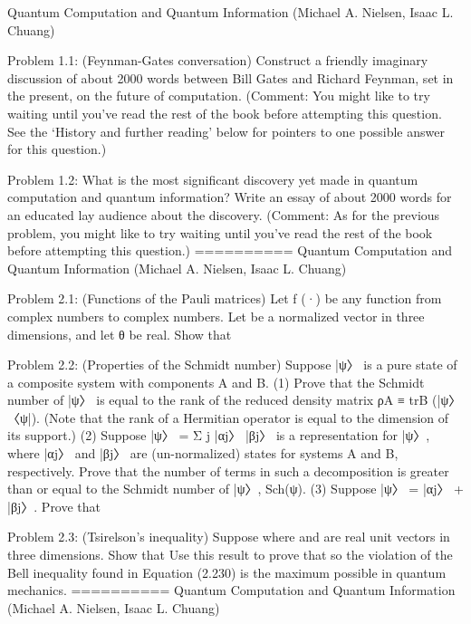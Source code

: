 \documentclass{article}
\newcommand{\0}{{$|0\rangle$}}
\newcommand{\1}{{$|1\rangle$}}
\newcommand{\2}{\frac{1}{\sqrt{2}}}
\begin{document}
Quantum Computation and Quantum Information (Michael A. Nielsen, Isaac L. Chuang)

Problem 1.1: (Feynman-Gates conversation) Construct a friendly imaginary discussion of about 2000 words between Bill Gates and Richard Feynman, set in the present, on the future of computation. (Comment: You might like to try waiting until you’ve read the rest of the book before attempting this question. See the ‘History and further reading’ below for pointers to one possible answer for this question.)

Problem 1.2: What is the most significant discovery yet made in quantum computation and quantum information? Write an essay of about 2000 words for an educated lay audience about the discovery. (Comment: As for the previous problem, you might like to try waiting until you’ve read the rest of the book before attempting this question.)
==========
Quantum Computation and Quantum Information (Michael A. Nielsen, Isaac L. Chuang)

Problem 2.1: (Functions of the Pauli matrices) Let f (·) be any function from complex numbers to complex numbers. Let be a normalized vector in three dimensions, and let θ be real. Show that

Problem 2.2: (Properties of the Schmidt number) Suppose |ψ〉 is a pure state of a composite system with components A and B. (1) Prove that the Schmidt number of |ψ〉 is equal to the rank of the reduced density matrix ρA ≡ trB (|ψ〉 〈ψ|). (Note that the rank of a Hermitian operator is equal to the dimension of its support.) (2) Suppose |ψ〉 = Σ j |αj〉 |βj〉 is a representation for |ψ〉, where |αj〉 and |βj〉 are (un-normalized) states for systems A and B, respectively. Prove that the number of terms in such a decomposition is greater than or equal to the Schmidt number of |ψ〉, Sch(ψ). (3) Suppose |ψ〉 = |αj〉 + |βj〉. Prove that

Problem 2.3: (Tsirelson’s inequality) Suppose where and are real unit vectors in three dimensions. Show that Use this result to prove that so the violation of the Bell inequality found in Equation (2.230) is the maximum possible in quantum mechanics.
==========
Quantum Computation and Quantum Information (Michael A. Nielsen, Isaac L. Chuang)
\end{document}
